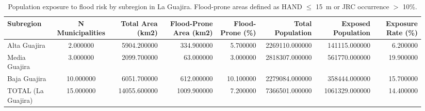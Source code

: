 \begin{table}[htbp]
\caption{Population exposure to flood risk by subregion in La Guajira. Flood-prone areas defined as HAND $\leq$ 15~m or JRC occurrence $>$ 10\%.}
\label{tab:population_exposure}
\begin{tabular}{lcrrrrrr}
\toprule
Subregion & N Municipalities & Total Area (km2) & Flood-Prone Area (km2) & Flood-Prone (\%) & Total Population & Exposed Population & Exposure Rate (\%) \\
\midrule
Alta Guajira & 2.000000 & 5904.200000 & 334.900000 & 5.700000 & 2269110.000000 & 141115.000000 & 6.200000 \\
Media Guajira & 3.000000 & 2099.700000 & 63.000000 & 3.000000 & 2818307.000000 & 561770.000000 & 19.900000 \\
Baja Guajira & 10.000000 & 6051.700000 & 612.000000 & 10.100000 & 2279084.000000 & 358444.000000 & 15.700000 \\
TOTAL (La Guajira) & 15.000000 & 14055.600000 & 1009.900000 & 7.200000 & 7366501.000000 & 1061329.000000 & 14.400000 \\
\bottomrule
\end{tabular}
\end{table}
